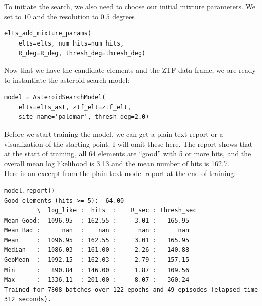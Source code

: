 To initiate the search, we also need to choose our initial mixture parameters.
We set  to $10$ and the resolution to $0.5$ degrees
\begin{lstlisting}[style=CodeSnippet]
elts_add_mixture_params(
	elts=elts, num_hits=num_hits, 
	R_deg=R_deg, thresh_deg=thresh_deg)
\end{lstlisting}
Now that we have the candidate elements and the ZTF data frame, we are ready to instantiate the asteroid search model:
\begin{lstlisting}[style=CodeSnippet]
model = AsteroidSearchModel(
	elts=elts_ast, ztf_elt=ztf_elt, 
	site_name='palomar', thresh_deg=2.0)
\end{lstlisting}
Before we start training the model, we can get a plain text report or a visualization of the starting point.
I will omit these here. 
The report shows that at the start of training, all 64 elements are ``good'' with 5 or more hits,
and the overall mean log likelihood is 3.13 and the mean number of hits is 162.7.\\
Here is an excerpt from the plain text model report at the end of training:\\
\begin{minipage}{\linewidth}
\begin{lstlisting}[style=CodeSnippet]
model.report()
Good elements (hits >= 5):  64.00
         \  log_like :  hits  :    R_sec : thresh_sec
Mean Good:  1096.95  : 162.55 :     3.01 :   165.95
Mean Bad :      nan  :    nan :      nan :      nan
Mean     :  1096.95  : 162.55 :     3.01 :   165.95
Median   :  1086.03  : 161.00 :     2.26 :   140.88
GeoMean  :  1092.15  : 162.03 :     2.79 :   157.15
Min      :   890.84  : 146.00 :     1.87 :   109.56
Max      :  1336.11  : 201.00 :     8.07 :   360.24
Trained for 7808 batches over 122 epochs and 49 episodes (elapsed time 312 seconds).
\end{lstlisting}
\end{minipage}

